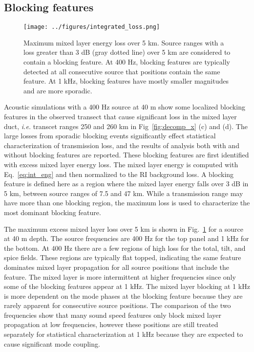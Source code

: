 \documentclass[preprint,NumberedRefs]{JASA}
\begin{document}
\subsection{Blocking features}\label{ssec:blocking}
\begin{figure}
\texttt{[image: ../figures/integrated\_loss.png]}
    \caption{Maximum mixed layer energy loss over 5 km. Source ranges with a loss greater than 3 dB (gray dotted line) over 5 km are considered to contain a blocking feature. At 400 Hz, blocking features are typically detected at all consecutive source that positions contain the same feature. At 1 kHz, blocking features have mostly smaller magnitudes and are more sporadic.}
    \label{fig:blocking}
\end{figure}

Acoustic simulations with a 400 Hz source at 40 m show some localized blocking features in the observed transect that cause significant loss in the mixed layer duct, \emph{i.e.} transcet ranges 250 and 260 km in Fig~\ref{fig:decomp_x} (c) and (d). The large losses from sporadic blocking events significantly effect statistical characterization of transmission loss, and the results of analysis both with and without blocking features are reported. These blocking features are first identified with excess mixed layer energy loss. The mixed layer energy is computed with Eq.~\eqref{eq:int_eng} and then normalized to the RI background loss. A blocking feature is defined here as a region where the mixed layer energy falls over 3 dB in 5 km, between source ranges of 7.5 and 47 km. While a transmission range may have more than one blocking region, the maximum loss is used to characterize the most dominant blocking feature.

The maximum excess mixed layer loss over 5 km is shown in Fig.~\ref{fig:blocking} for a source at 40 m depth. The source frequencies are 400 Hz for the top panel and 1 kHz for the bottom. At 400 Hz there are a few regions of high loss for the total, tilt, and spice fields. These regions are typically flat topped, indicating the same feature dominates mixed layer propagation for all source positions that include the feature. The mixed layer is more intermittent at higher frequencies since only some of the blocking features appear at 1 kHz. The mixed layer blocking at 1 kHz is more dependent on the mode phases at the blocking feature because they are rarely apparent for consecutive source positions. The comparison of the two frequencies show that many sound speed features only block mixed layer propagation at low frequencies, however these positions are still treated separately for statistical characterization at 1 kHz because they are expected to cause significant mode coupling.
\end{document}
